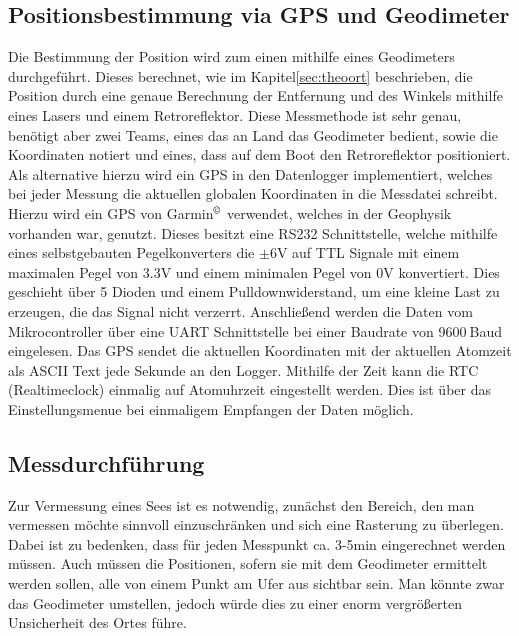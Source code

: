 \documentclass[12pt,a4paper,titlepage,headinclude,bibtotoc]{scrartcl}
\begin{document}
\subsection{Positionsbestimmung via GPS und Geodimeter}
\label{sec:durchpos}
Die Bestimmung der Position wird zum einen mithilfe eines Geodimeters durchgeführt.
Dieses berechnet, wie im Kapitel\ref{sec:theoort} beschrieben, die Position durch eine genaue Berechnung der Entfernung und des Winkels mithilfe eines Lasers und einem Retroreflektor.
Diese Messmethode ist sehr genau, benötigt aber zwei Teams, eines das an Land das Geodimeter bedient, sowie die Koordinaten notiert und eines, dass auf dem Boot den Retroreflektor positioniert.\\
Als alternative hierzu wird ein GPS in den Datenlogger implementiert, welches bei jeder Messung die aktuellen globalen Koordinaten in die Messdatei schreibt.
Hierzu wird ein GPS von Garmin$^{\copyright}$ verwendet, welches in der Geophysik vorhanden war, genutzt.
Dieses besitzt eine RS232 Schnittstelle, welche mithilfe eines selbstgebauten Pegelkonverters die $\pm6\si{\volt}$ auf TTL Signale mit einem maximalen Pegel von 3.3\si{\volt} und einem minimalen Pegel von 0\si{\volt} konvertiert.
Dies geschieht über 5 Dioden und einem Pulldownwiderstand, um eine kleine Last zu erzeugen, die das Signal nicht verzerrt.
Anschließend werden die Daten vom Mikrocontroller über eine UART Schnittstelle bei einer Baudrate von 9600$~$Baud eingelesen.
Das GPS sendet die aktuellen Koordinaten mit der aktuellen Atomzeit als ASCII Text jede Sekunde an den Logger.
Mithilfe der Zeit kann die RTC (Realtimeclock) einmalig auf Atomuhrzeit eingestellt werden.
Dies ist über das Einstellungsmenue bei einmaligem Empfangen der Daten möglich.

\subsection{Messdurchführung}

Zur Vermessung eines Sees ist es notwendig, zunächst den Bereich, den man vermessen möchte sinnvoll einzuschränken und sich eine Rasterung zu überlegen.
Dabei ist zu bedenken, dass für jeden Messpunkt ca. 3-5min eingerechnet werden müssen.
Auch müssen die Positionen, sofern sie mit dem Geodimeter ermittelt werden sollen, alle von einem Punkt am Ufer aus sichtbar sein.
Man könnte zwar das Geodimeter umstellen, jedoch würde dies zu einer enorm vergrößerten Unsicherheit des Ortes führe.
\end{document}
